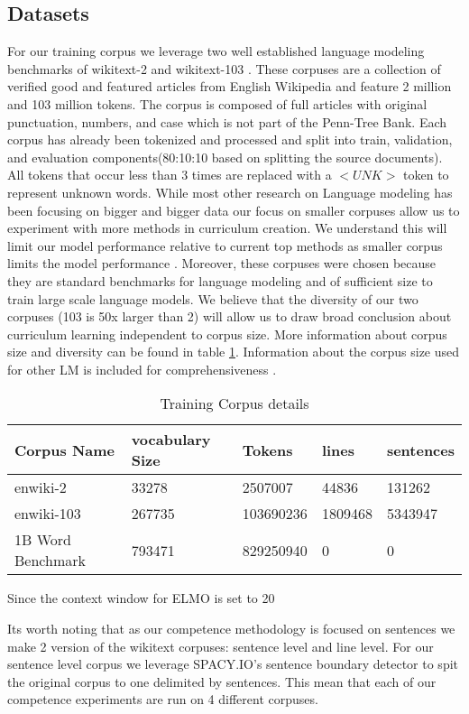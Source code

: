 \subsection{Datasets}
For our training corpus we leverage two well established language modeling benchmarks of wikitext-2 and wikitext-103 \cite{Merity2016PointerSM}. These corpuses are a collection of verified good and featured articles from English Wikipedia and feature 2 million and 103 million tokens. The corpus is composed of full articles with original punctuation, numbers, and case which is not part of the Penn-Tree Bank. Each corpus has already been tokenized and processed and split into train, validation, and evaluation components(80:10:10 based on splitting the source documents). All tokens that occur less than 3 times are replaced with a $<UNK>$ token to represent unknown words. While most other research on Language modeling has been focusing on bigger and bigger data our focus on smaller corpuses allow us to experiment with more methods in curriculum creation. We understand this will limit our model performance relative to current top methods as smaller corpus limits the model performance \cite{Kaplan2020ScalingLF}. Moreover, these corpuses were chosen because they are standard benchmarks for language modeling and of sufficient size to train large scale language models. We believe that the diversity of our two corpuses (103 is 50x larger than 2) will allow us to draw broad conclusion about curriculum learning independent to corpus size. More information about corpus size and diversity can be found in table \ref{table:1}. Information about the corpus size used for other LM is included for comprehensiveness \cite{Chelba2014OneBW}.\\
\begin{table}[h!]
\begin{tabular}{|l|l|l|l|l|} \hline
\textbf{Corpus Name} & \textbf{vocabulary Size} & \textbf{Tokens} & \textbf{lines} & \textbf{sentences} \\ \hline
enwiki-2 & 33278 & 2507007 & 44836 & 131262 \\ \hline
enwiki-103 & 267735 & 103690236 & 1809468  & 5343947 \\ \hline
1B Word Benchmark & 793471 & 829250940 & 0 & 0 \\ \hline
\end{tabular}
Since the context window for ELMO is set to 20 
\caption{Training Corpus details}
\label{table:1}
\end{table}
Its worth noting that as our competence methodology is focused on sentences we make 2 version of the wikitext corpuses: sentence level and line level. For our sentence level corpus we leverage SPACY.IO's sentence boundary detector to spit the original corpus to one delimited by sentences. This mean that each of our competence experiments are run on 4 different corpuses.
